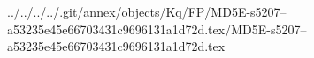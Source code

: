 ../../../../.git/annex/objects/Kq/FP/MD5E-s5207--a53235e45e66703431c9696131a1d72d.tex/MD5E-s5207--a53235e45e66703431c9696131a1d72d.tex